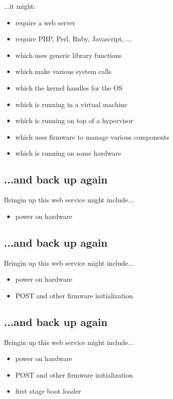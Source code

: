 \documentclass[xga]{xdvislides}
\begin{document}
...it might:

\begin{itemize}
	\item require a web server
	\item require PHP, Perl, Ruby, Javascript, ...
	\item which uses generic library functions
	\item which make various system calls
	\item which the kernel handles for the OS
	\item which is running in a virtual machine
	\item which is running on top of a hypervisor
	\item which uses firmware to manage various components
	\item which is running on some hardware
\end{itemize}

\subsection{...and back up again}
Bringin up this web service might include...
\\

\begin{itemize}
	\item power on hardware
\end{itemize}

\subsection{...and back up again}
Bringin up this web service might include...
\\

\begin{itemize}
	\item power on hardware
	\item POST and other firmware initialization
\end{itemize}

\subsection{...and back up again}
Bringin up this web service might include...
\\

\begin{itemize}
	\item power on hardware
	\item POST and other firmware initialization
	\item first stage boot loader
\end{itemize}
\end{document}

